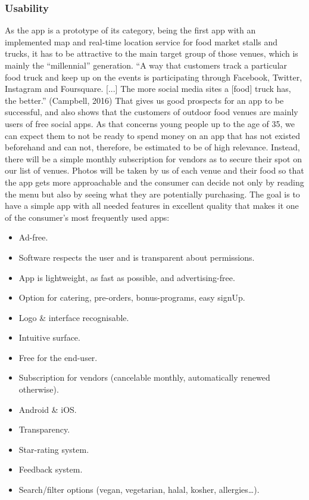 \subsubsection{Usability}


As the app is a prototype of its category, being the first app with an implemented map and real-time location service for food market stalls and trucks, it has to be attractive to the main target group of those venues, which is mainly the “millennial” generation. “A way that customers track a particular food truck and keep up on the events is participating through Facebook, Twitter, Instagram and Foursquare. [...] The more social media sites a [food] truck has, the better.” (Campbell, 2016) That gives us good prospects for an app to be successful, and also shows that the customers of outdoor food venues are mainly users of free social apps. As that concerns young people up to the age of 35, we can expect them to not be ready to spend money on an app that has not existed beforehand and can not, therefore, be estimated to be of high relevance. Instead, there will be a simple monthly subscription for vendors as to secure their spot on our list of venues. Photos will be taken by us of each venue and their food so that the app gets more approachable and the consumer can decide not only by reading the menu but also by seeing what they are potentially purchasing. The goal is to have a simple app with all needed features in excellent quality that makes it one of the consumer’s most frequently used apps:

\begin{itemize}
\item Ad-free.
\item Software respects the user and is transparent about permissions.
\item App is lightweight, as fast as possible, and advertising-free.
\item Option for catering, pre-orders, bonus-programs, easy signUp.
\item Logo \& interface recognisable.
\item Intuitive surface.
\item Free for the end-user.
\item Subscription for vendors (cancelable monthly, automatically renewed otherwise).
\item Android \& iOS.
\item Transparency.
\item Star-rating system.
\item Feedback system.
\item Search/filter options (vegan, vegetarian, halal, kosher, allergies…).
\end{itemize}


